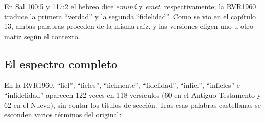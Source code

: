 \documentclass[11pt,letterpaper]{article}
\begin{document}
\begin{nota}[Precisión]
En Sal 100:5 y 117:2 el hebreo dice \emph{emuná} y \emph{emet}, respectivamente; la RVR1960 traduce la primera ``verdad'' y la segunda ``fidelidad''. Como se vio en el capítulo 13, ambas palabras proceden de la misma raíz, y las versiones eligen uno u otro matiz según el contexto.
\end{nota}

\subsection{El espectro completo}
En la RVR1960, ``fiel'', ``fieles'', ``fielmente'', ``fidelidad'', ``infiel'', ``infieles'' e ``infidelidad'' aparecen 122 veces en 118 versículos (60 en el Antiguo Testamento y 62 en el Nuevo), sin contar los títulos de sección. Tras esas palabras castellanas se esconden varios términos del original:
\end{document}
